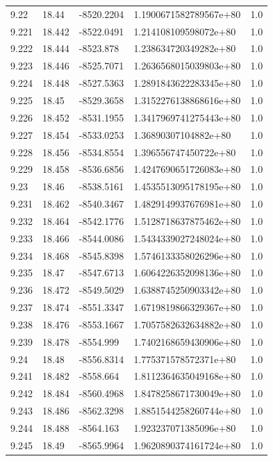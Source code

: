 \begin{tabular}{lllll}
9.22 & 18.44 & -8520.2204 & 1.1900671582789567e+80 & 1.0 \\
9.221 & 18.442 & -8522.0491 & 1.214108109598072e+80 & 1.0 \\
9.222 & 18.444 & -8523.878 & 1.238634720349282e+80 & 1.0 \\
9.223 & 18.446 & -8525.7071 & 1.2636568015039803e+80 & 1.0 \\
9.224 & 18.448 & -8527.5363 & 1.2891843622283345e+80 & 1.0 \\
9.225 & 18.45 & -8529.3658 & 1.3152276138868616e+80 & 1.0 \\
9.226 & 18.452 & -8531.1955 & 1.3417969741275443e+80 & 1.0 \\
9.227 & 18.454 & -8533.0253 & 1.36890307104882e+80 & 1.0 \\
9.228 & 18.456 & -8534.8554 & 1.396556747450722e+80 & 1.0 \\
9.229 & 18.458 & -8536.6856 & 1.4247690651726083e+80 & 1.0 \\
9.23 & 18.46 & -8538.5161 & 1.4535513095178195e+80 & 1.0 \\
9.231 & 18.462 & -8540.3467 & 1.4829149937676981e+80 & 1.0 \\
9.232 & 18.464 & -8542.1776 & 1.5128718637875462e+80 & 1.0 \\
9.233 & 18.466 & -8544.0086 & 1.5434339027248024e+80 & 1.0 \\
9.234 & 18.468 & -8545.8398 & 1.5746133358026296e+80 & 1.0 \\
9.235 & 18.47 & -8547.6713 & 1.6064226352098136e+80 & 1.0 \\
9.236 & 18.472 & -8549.5029 & 1.6388745250903342e+80 & 1.0 \\
9.237 & 18.474 & -8551.3347 & 1.6719819866329367e+80 & 1.0 \\
9.238 & 18.476 & -8553.1667 & 1.7057582632634882e+80 & 1.0 \\
9.239 & 18.478 & -8554.999 & 1.7402168659430906e+80 & 1.0 \\
9.24 & 18.48 & -8556.8314 & 1.775371578572371e+80 & 1.0 \\
9.241 & 18.482 & -8558.664 & 1.8112364635049168e+80 & 1.0 \\
9.242 & 18.484 & -8560.4968 & 1.8478258671730049e+80 & 1.0 \\
9.243 & 18.486 & -8562.3298 & 1.8851544258260744e+80 & 1.0 \\
9.244 & 18.488 & -8564.163 & 1.923237071385096e+80 & 1.0 \\
9.245 & 18.49 & -8565.9964 & 1.9620890374161724e+80 & 1.0 \\

\end{tabular}
